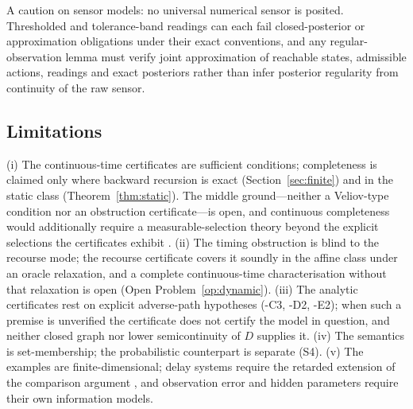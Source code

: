 A caution on sensor models: no universal numerical sensor is posited. Thresholded and tolerance-band readings can each fail closed-posterior or approximation obligations under their exact conventions, and any regular-observation lemma must verify joint approximation of reachable states, admissible actions, readings and exact posteriors rather than infer posterior regularity from continuity of the raw sensor.

\subsection{Limitations}\label{sec:limitations}

(i) The continuous-time certificates are sufficient conditions; completeness is claimed only where backward recursion is exact (Section~\ref{sec:finite}) and in the static class (Theorem~\ref{thm:static}). The middle ground---neither a Veliov-type condition nor an obstruction certificate---is open, and continuous completeness would additionally require a measurable-selection theory beyond the explicit selections the certificates exhibit \citep{bertsekas1978}. (ii) The timing obstruction is blind to the recourse mode; the recourse certificate covers it soundly in the affine class under an oracle relaxation, and a complete continuous-time characterisation without that relaxation is open (Open Problem~\ref{op:dynamic}). (iii) The analytic certificates rest on explicit adverse-path hypotheses (\hyp{C3}, \hyp{D2}, \hyp{E2}); when such a premise is unverified the certificate does not certify the model in question, and neither closed graph nor lower semicontinuity of $D$ supplies it. (iv) The semantics is set-membership; the probabilistic counterpart is separate (S4). (v) The examples are finite-dimensional; delay systems require the retarded extension of the comparison argument \citep{hale1993}, and observation error and hidden parameters require their own information models.
